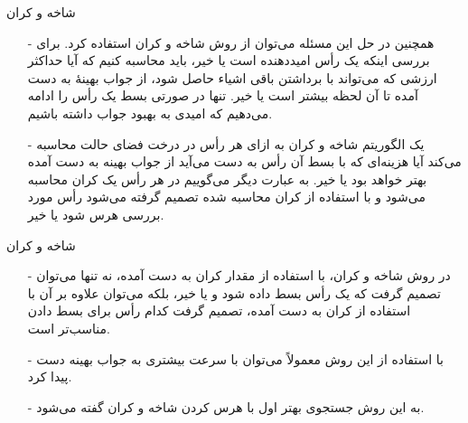 \begin{frame}{شاخه و کران}
\begin{itemize}\itemr
\item[-]
همچنین در حل این مسئله
 می‌توان از روش شاخه و کران استفاده کرد. برای بررسی اینکه
 یک رأس امیددهنده است یا خیر،
باید محاسبه کنیم که آیا حداکثر ارزشی که می‌تواند با برداشتن باقی اشیاء حاصل شود، از جواب بهینهٔ به دست آمده تا آن لحظه بیشتر است یا خیر.
تنها در صورتی بسط یک رأس را ادامه می‌دهیم که امیدی به بهبود جواب داشته باشیم.
\item[-]
یک الگوریتم شاخه و کران به ازای هر رأس در درخت فضای حالت محاسبه می‌کند آیا هزینه‌ای که با بسط آن رأس به دست می‌آید از جواب بهینه به دست آمده بهتر خواهد بود یا خیر. به عبارت دیگر می‌گوییم در هر رأس یک کران محاسبه می‌شود و با استفاده از کران محاسبه شده تصمیم گرفته می‌شود رأس مورد بررسی هرس شود یا خیر.
\end{itemize}
\end{frame}

\begin{frame}{شاخه و کران}
\begin{itemize}\itemr
\item[-]
در روش شاخه و کران، با استفاده از مقدار کران به دست آمده، نه تنها می‌توان تصمیم گرفت که یک رأس بسط داده شود و یا خیر، بلکه می‌توان علاوه بر آن با استفاده از کران به دست آمده، تصمیم گرفت کدام رأس برای بسط دادن مناسب‌تر است.
\item[-]
با استفاده از این روش معمولاً می‌توان با سرعت بیشتری به جواب بهینه دست پیدا کرد.
\item[-]
به این روش جستجوی بهتر اول
با هرس کردن شاخه و کران
گفته می‌شود.
\end{itemize}
\end{frame}


